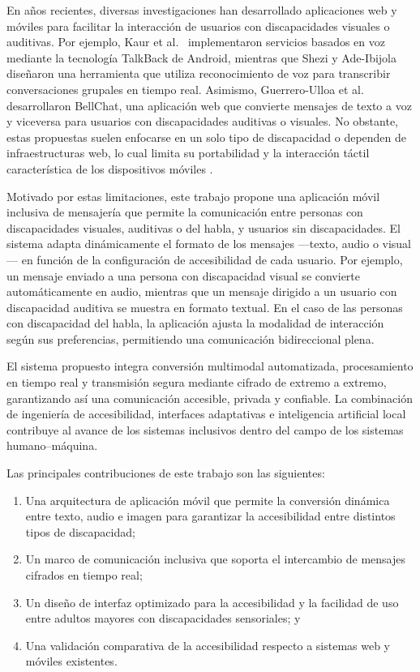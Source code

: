 \documentclass[lettersize,journal]{IEEEtran}
\begin{document}
        En años recientes, diversas investigaciones han desarrollado aplicaciones web y móviles para facilitar la interacción de usuarios con discapacidades visuales o auditivas. Por ejemplo, Kaur et al.~\cite{Kaur2020} implementaron servicios basados en voz mediante la tecnología TalkBack de Android, mientras que Shezi y Ade-Ibijola~\cite{Shezi2020} diseñaron una herramienta que utiliza reconocimiento de voz para transcribir conversaciones grupales en tiempo real. Asimismo, Guerrero-Ulloa et al.~\cite{GuerreroUlloa2024} desarrollaron BellChat, una aplicación web que convierte mensajes de texto a voz y viceversa para usuarios con discapacidades auditivas o visuales. No obstante, estas propuestas suelen enfocarse en un solo tipo de discapacidad o dependen de infraestructuras web, lo cual limita su portabilidad y la interacción táctil característica de los dispositivos móviles \cite{Sami2023}.
        
        Motivado por estas limitaciones, este trabajo propone una aplicación móvil inclusiva de mensajería que permite la comunicación entre personas con discapacidades visuales, auditivas o del habla, y usuarios sin discapacidades. El sistema adapta dinámicamente el formato de los mensajes —texto, audio o visual— en función de la configuración de accesibilidad de cada usuario. Por ejemplo, un mensaje enviado a una persona con discapacidad visual se convierte automáticamente en audio, mientras que un mensaje dirigido a un usuario con discapacidad auditiva se muestra en formato textual. En el caso de las personas con discapacidad del habla, la aplicación ajusta la modalidad de interacción según sus preferencias, permitiendo una comunicación bidireccional plena.
        
        El sistema propuesto integra conversión multimodal automatizada, procesamiento en tiempo real y transmisión segura mediante cifrado de extremo a extremo, garantizando así una comunicación accesible, privada y confiable. La combinación de ingeniería de accesibilidad, interfaces adaptativas e inteligencia artificial local contribuye al avance de los sistemas inclusivos dentro del campo de los sistemas humano–máquina.
        
        Las principales contribuciones de este trabajo son las siguientes:
        \begin{enumerate}
            \item Una arquitectura de aplicación móvil que permite la conversión dinámica entre texto, audio e imagen para garantizar la accesibilidad entre distintos tipos de discapacidad;
            \item Un marco de comunicación inclusiva que soporta el intercambio de mensajes cifrados en tiempo real;
            \item Un diseño de interfaz optimizado para la accesibilidad y la facilidad de uso entre adultos mayores con discapacidades sensoriales; y
            \item Una validación comparativa de la accesibilidad respecto a sistemas web y móviles existentes.
        \end{enumerate}
        
\end{document}
